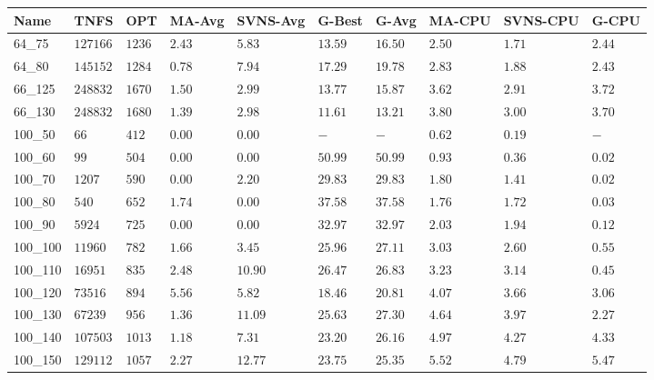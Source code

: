 \begin{center}
\begin{table}[]
\centering
\begin{tabular}{|lll|l|l|ll|lll|}
\hline
Name     & TNFS        & OPT    & MA-Avg & SVNS-Avg & G-Best & G-Avg & MA-CPU & SVNS-CPU & G-CPU \\
\hline
64\_75   & $127166   $ & $1236$ & $2.43$ & $5.83 $  & $13.59$    & $16.50$   & $2.50$ & $1.71 $  & $2.44$ \\
64\_80   & $145152   $ & $1284$ & $0.78$ & $7.94 $  & $17.29$    & $19.78$   & $2.83$ & $1.88 $  & $2.43$ \\
\hline
66\_125  & $248832   $ & $1670$ & $1.50$ & $2.99 $  & $13.77$    & $15.87$   & $3.62$ & $2.91 $  & $3.72$ \\
66\_130  & $248832   $ & $1680$ & $1.39$ & $2.98 $  & $11.61$    & $13.21$   & $3.80$ & $3.00 $  & $3.70$ \\
\hline
100\_50  & $66       $ & $412 $ & $\bm{0.00}$ & $\bm{0.00} $  & $-    $    & $-    $   & $0.62$ & $0.19 $  & $-   $ \\
100\_60  & $99       $ & $504 $ & $\bm{0.00}$ & $\bm{0.00} $  & $50.99$    & $50.99$   & $0.93$ & $0.36 $  & $0.02$ \\
100\_70  & $1207     $ & $590 $ & $\bm{0.00}$ & $2.20 $  & $29.83$    & $29.83$   & $1.80$ & $1.41 $  & $0.02$ \\
100\_80  & $540      $ & $652 $ & $1.74$ & $\bm{0.00} $  & $37.58$    & $37.58$   & $1.76$ & $1.72 $  & $0.03$ \\
100\_90  & $5924     $ & $725 $ & $\bm{0.00}$ & $\bm{0.00} $  & $32.97$    & $32.97$   & $2.03$ & $1.94 $  & $0.12$ \\
100\_100 & $11960    $ & $782 $ & $1.66$ & $3.45 $  & $25.96$    & $27.11$   & $3.03$ & $2.60 $  & $0.55$ \\
100\_110 & $16951    $ & $835 $ & $2.48$ & $10.90$  & $26.47$    & $26.83$   & $3.23$ & $3.14 $  & $0.45$ \\
100\_120 & $73516    $ & $894 $ & $5.56$ & $5.82 $  & $18.46$    & $20.81$   & $4.07$ & $3.66 $  & $3.06$ \\
100\_130 & $67239    $ & $956 $ & $1.36$ & $11.09$  & $25.63$    & $27.30$   & $4.64$ & $3.97 $  & $2.27$ \\
100\_140 & $107503   $ & $1013$ & $1.18$ & $7.31 $  & $23.20$    & $26.16$   & $4.97$ & $4.27 $  & $4.33$ \\
100\_150 & $129112   $ & $1057$ & $2.27$ & $12.77$  & $23.75$    & $25.35$   & $5.52$ & $4.79 $  & $5.47$ \\

\end{tabular}
\end{table}
\end{center}
